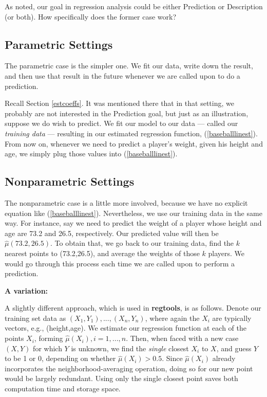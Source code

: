 As noted, our goal in regression analysis could be either Prediction or
Description (or both).  How specifically does the former case work?

\subsection{Parametric Settings}

The parametric case is the simpler one.  We fit our data, write down the
result, and then use that result in the future whenever we are called
upon to do a prediction.

Recall Section \ref{estcoeffs}.  It was mentioned there that in that
setting, we probably are not interested in the Prediction goal, but just
as an illustration, suppose we do wish to predict.  We fit our model to
our data --- called our {\it training data} --- resulting in our
estimated regression function, (\ref{baseballlinest}).  From now on,
whenever we need to predict a player's weight, given his height and age,
we simply plug those values into (\ref{baseballlinest}).

\subsection{Nonparametric Settings}
\label{howprednonpar}

The nonparametric case is a little more involved, because we have no
explicit equation like (\ref{baseballlinest}).  Nevertheless, we use our
training data in the same way.  For instance, say we need to predict the
weight of a player whose height and age are 73.2 and 26.5, respectively.
Our predicted value will then be $\widehat{\mu}(73.2,26.5)$.  To obtain
that, we go back to our training data, find the $k$ nearest points to
(73.2,26.5), and average the weights of those $k$ players. We would go
through this process each time we are called upon to perform a
prediction.

{\bf A variation:} 

A slightly different approach, which is used in {\bf regtools}, is as
follows.  Denote our training set data as $(X_1,Y_1),...,(X_n,Y_n)$,
where again the $X_i$ are typically vectors, e.g., (height,age).  We
estimate our regression function at each of the points $X_i$, forming
$\widehat{\mu}(X_i), i = 1,...,n$.  Then, when faced with a new case
$(X,Y)$ for which $Y$ is unknown, we find the {\it single} closest $X_i$
to $X$, and guess $Y$ to be 1 or 0, depending on whether
$\widehat{\mu}(X_i) > 0.5$.  Since $\widehat{\mu}(X_i)$ already
incorporates the neighborhood-averaging operation, doing so for our new
point would be largely redundant.  Using only the single closest point
saves both computation time and storage space.


